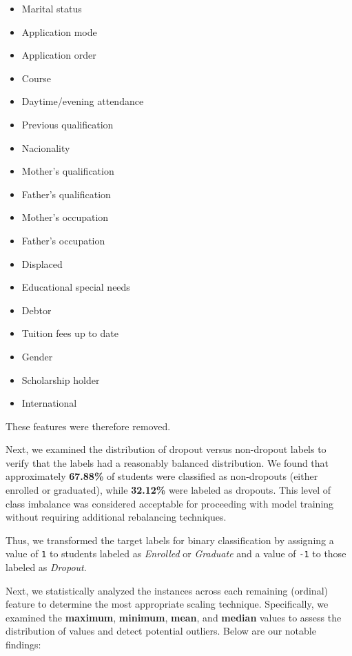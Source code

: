 \documentclass[12pt]{article}
\begin{document}
\begin{itemize}
    \item Marital status
    \item Application mode
    \item Application order
    \item Course
    \item Daytime/evening attendance
    \item Previous qualification
    \item Nacionality
    \item Mother's qualification
    \item Father's qualification
    \item Mother's occupation
    \item Father's occupation
    \item Displaced
    \item Educational special needs
    \item Debtor
    \item Tuition fees up to date
    \item Gender
    \item Scholarship holder
    \item International
\end{itemize}

These features were therefore removed.

Next, we examined the distribution of dropout versus non-dropout labels to verify that the labels had a reasonably balanced distribution. We found that approximately \textbf{67.88\%} of students were classified as non-dropouts (either enrolled or graduated), while \textbf{32.12\%} were labeled as dropouts. This level of class imbalance was considered acceptable for proceeding with model training without requiring additional rebalancing techniques.

Thus, we transformed the target labels for binary classification by assigning a value of \texttt{1} to students labeled as \textit{Enrolled} or \textit{Graduate} and a value of \texttt{-1} to those labeled as \textit{Dropout}.

Next, we statistically analyzed the instances across each remaining (ordinal) feature to determine the most appropriate scaling technique. Specifically, we examined the \textbf{maximum}, \textbf{minimum}, \textbf{mean}, and \textbf{median} values to assess the distribution of values and detect potential outliers. Below are our notable findings:
\end{document}
